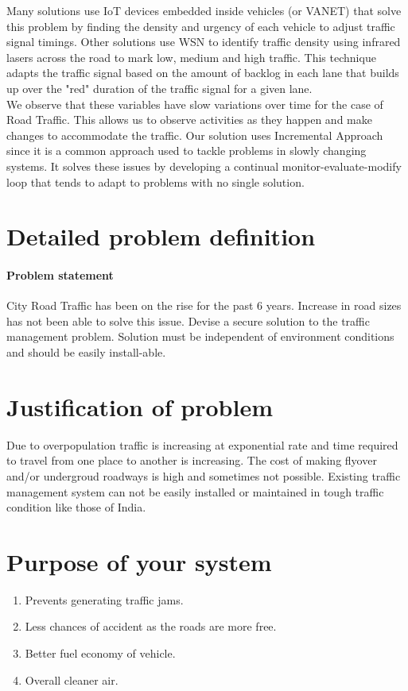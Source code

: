 \documentclass[twoside,a4paper,12pt]{book}
\begin{document}
Many solutions use IoT devices embedded inside vehicles (or VANET) that solve this problem by finding the density and urgency of each vehicle to adjust traffic signal timings. Other solutions use WSN to identify traffic density using infrared lasers across the road to mark low, medium and high traffic. This technique adapts the traffic signal based on the amount of backlog in each lane that builds up over the "red" duration of the traffic signal for a given lane.\\

We observe that these variables have slow variations over time for the case of Road Traffic. This allows us to observe activities as they happen and make changes to accommodate the traffic. Our solution uses Incremental Approach since it is a common approach used to tackle problems in slowly changing systems. It solves these issues by developing a continual monitor-evaluate-modify loop that tends to adapt to problems with no single solution. 





\section{Detailed problem definition}
\paragraph*{Problem statement}
City Road Traffic has been on the rise for the past 6 years. Increase in road sizes has not been able to solve this issue. Devise a secure solution to the traffic management problem. Solution must be independent of environment conditions and should be easily install-able.

\newpage
\section{Justification of problem }
Due to overpopulation traffic is increasing at exponential rate and time required to travel from one place to another is increasing. The cost of making flyover and/or undergroud roadways is high and sometimes not possible. Existing traffic management system can not be easily installed or maintained in tough traffic condition like those of India.
\vspace{0.2\textwidth}
\section{Purpose of your system}
\begin{enumerate}
    \item Prevents generating traffic jams.
    \item Less chances of accident as the roads are more free.
    \item Better fuel economy of vehicle.
    \item Overall cleaner air.
\end{enumerate}
\end{document}
